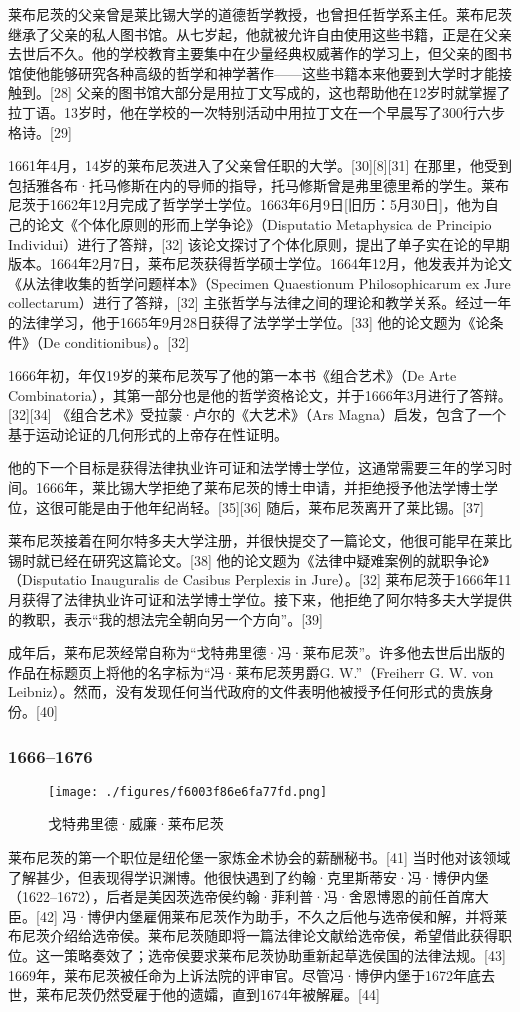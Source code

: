 莱布尼茨的父亲曾是莱比锡大学的道德哲学教授，也曾担任哲学系主任。莱布尼茨继承了父亲的私人图书馆。从七岁起，他就被允许自由使用这些书籍，正是在父亲去世后不久。他的学校教育主要集中在少量经典权威著作的学习上，但父亲的图书馆使他能够研究各种高级的哲学和神学著作——这些书籍本来他要到大学时才能接触到。[28] 父亲的图书馆大部分是用拉丁文写成的，这也帮助他在12岁时就掌握了拉丁语。13岁时，他在学校的一次特别活动中用拉丁文在一个早晨写了300行六步格诗。[29]

1661年4月，14岁的莱布尼茨进入了父亲曾任职的大学。[30][8][31] 在那里，他受到包括雅各布·托马修斯在内的导师的指导，托马修斯曾是弗里德里希的学生。莱布尼茨于1662年12月完成了哲学学士学位。1663年6月9日[旧历：5月30日]，他为自己的论文《个体化原则的形而上学争论》（Disputatio Metaphysica de Principio Individui）进行了答辩，[32] 该论文探讨了个体化原则，提出了单子实在论的早期版本。1664年2月7日，莱布尼茨获得哲学硕士学位。1664年12月，他发表并为论文《从法律收集的哲学问题样本》（Specimen Quaestionum Philosophicarum ex Jure collectarum）进行了答辩，[32] 主张哲学与法律之间的理论和教学关系。经过一年的法律学习，他于1665年9月28日获得了法学学士学位。[33] 他的论文题为《论条件》（De conditionibus）。[32]

1666年初，年仅19岁的莱布尼茨写了他的第一本书《组合艺术》（De Arte Combinatoria），其第一部分也是他的哲学资格论文，并于1666年3月进行了答辩。[32][34] 《组合艺术》受拉蒙·卢尔的《大艺术》（Ars Magna）启发，包含了一个基于运动论证的几何形式的上帝存在性证明。

他的下一个目标是获得法律执业许可证和法学博士学位，这通常需要三年的学习时间。1666年，莱比锡大学拒绝了莱布尼茨的博士申请，并拒绝授予他法学博士学位，这很可能是由于他年纪尚轻。[35][36] 随后，莱布尼茨离开了莱比锡。[37]

莱布尼茨接着在阿尔特多夫大学注册，并很快提交了一篇论文，他很可能早在莱比锡时就已经在研究这篇论文。[38] 他的论文题为《法律中疑难案例的就职争论》（Disputatio Inauguralis de Casibus Perplexis in Jure）。[32] 莱布尼茨于1666年11月获得了法律执业许可证和法学博士学位。接下来，他拒绝了阿尔特多夫大学提供的教职，表示“我的想法完全朝向另一个方向”。[39]

成年后，莱布尼茨经常自称为“戈特弗里德·冯·莱布尼茨”。许多他去世后出版的作品在标题页上将他的名字标为“冯·莱布尼茨男爵G. W.”（Freiherr G. W. von Leibniz）。然而，没有发现任何当代政府的文件表明他被授予任何形式的贵族身份。[40]
\subsubsection{1666–1676}
\begin{figure}[ht]
\centering
\texttt{[image: ./figures/f6003f86e6fa77fd.png]}
\caption{戈特弗里德·威廉·莱布尼茨} \label{fig_LBNC_1}
\end{figure}
莱布尼茨的第一个职位是纽伦堡一家炼金术协会的薪酬秘书。[41] 当时他对该领域了解甚少，但表现得学识渊博。他很快遇到了约翰·克里斯蒂安·冯·博伊内堡（1622–1672），后者是美因茨选帝侯约翰·菲利普·冯·舍恩博恩的前任首席大臣。[42] 冯·博伊内堡雇佣莱布尼茨作为助手，不久之后他与选帝侯和解，并将莱布尼茨介绍给选帝侯。莱布尼茨随即将一篇法律论文献给选帝侯，希望借此获得职位。这一策略奏效了；选帝侯要求莱布尼茨协助重新起草选侯国的法律法规。[43] 1669年，莱布尼茨被任命为上诉法院的评审官。尽管冯·博伊内堡于1672年底去世，莱布尼茨仍然受雇于他的遗孀，直到1674年被解雇。[44]

